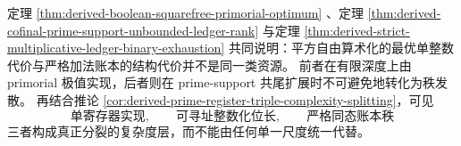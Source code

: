 \begin{remark}\label{rem:derived-prime-register-primorial-ledger-closed-chain}
定理 \ref{thm:derived-boolean-squarefree-primorial-optimum}
、定理 \ref{thm:derived-cofinal-prime-support-unbounded-ledger-rank}
与定理 \ref{thm:derived-strict-multiplicative-ledger-binary-exhaustion}
共同说明：平方自由算术化的最优单整数代价与严格加法账本的结构代价并不是同一类资源。
前者在有限深度上由 primorial 极值实现，后者则在 prime-support 共尾扩展时不可避免地转化为秩发散。
再结合推论 \ref{cor:derived-prime-register-triple-complexity-splitting}，可见
\[
\text{单寄存器实现},
\qquad
\text{可寻址整数化位长},
\qquad
\text{严格同态账本秩}
\]
三者构成真正分裂的复杂度层，而不能由任何单一尺度统一代替。
\end{remark}

\endinput
